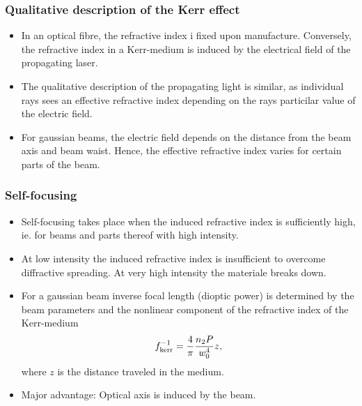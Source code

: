 \begin{frame}
  \frametitle{Qualitative description of the Kerr effect}

  \begin{itemize}
  \item In an optical fibre, the refractive index i fixed upon
    manufacture. Conversely, the refractive index in a Kerr-medium is
    \alert{induced} by the electrical field of the propagating laser.

  \item The qualitative description of the propagating light is
    similar, as individual rays sees an effective refractive index
    depending on the rays particilar value of the electric field.

  \item For gaussian beams, the electric field depends on the distance
    from the beam axis and beam waist. Hence, the effective refractive
    index varies for certain parts of the beam.
  \end{itemize}
\end{frame}


\begin{frame}
  \frametitle{Self-focusing}

  \begin{itemize}
  \item Self-focusing takes place when the induced refractive index is
    sufficiently high, ie. for beams and parts thereof with high
    intensity.

  \item At low intensity the induced refractive index is insufficient
    to overcome diffractive spreading. At very high intensity the
    materiale breaks down.

  \item For a gaussian beam inverse focal length (dioptic power) is
    determined by the beam parameters and the nonlinear component of
    the refractive index of the Kerr-medium
    \begin{align*}
        f_{\textup{kerr}}^{-1} = \frac{4}{\pi} \frac{n_2 P}{w_0^4} z,
    \end{align*}
    where $z$ is the distance traveled in the medium.

  \item Major advantage: Optical axis is induced by the beam.
  \end{itemize}

\end{frame}


